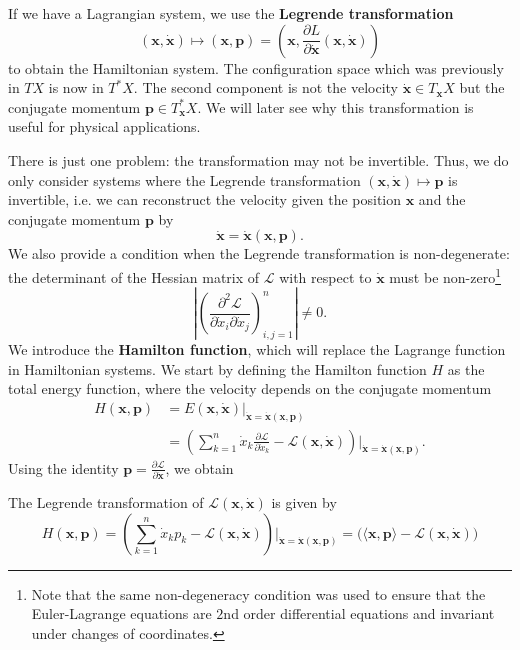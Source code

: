 \documentclass[hidelinks,a4paper, 11pt]{article}
\theoremstyle{plain}
\theoremstyle{break}
\theoremstyle{plain}
\theoremstyle{definition}
\begin{document}
{If we have a Lagrangian system, we use the \textbf{Legrende transformation}
\[
	(\mathbf x, \mathbf{\dot x}) \mapsto (\mathbf x, \mathbf p) = (\mathbf x, \frac{\partial L}{\partial \mathbf{\dot x}}(\mathbf x, \mathbf{\dot x}))
\]
to obtain the Hamiltonian system. The configuration space which was previously in $TX$ is now in $T^*X$. The second component is not the velocity $\mathbf{\dot x} \in T_{\mathbf x}X$ but the conjugate momentum $\mathbf p \in T_{\mathbf x}^*X$. We will later see why this transformation is useful for physical applications.

There is just one problem: the transformation may not be invertible. Thus, we do only consider systems where the Legrende transformation $(\mathbf x, \mathbf{\dot x}) \mapsto \mathbf p$ is invertible, i.e. we can reconstruct the velocity given the position $\mathbf x$ and the conjugate momentum $\mathbf p$ by
\[
	\mathbf{\dot x} = \mathbf{\dot x(\mathbf x, \mathbf p)}.
\]
We also provide a condition when the Legrende transformation is non-degenerate: the determinant of the Hessian matrix of $\mathcal L$ with respect to $\mathbf{\dot x}$ must be non-zero\footnote{Note that the same non-degeneracy condition was used to ensure that the Euler-Lagrange equations are $2$nd order differential equations and invariant under changes of coordinates.}
\[
	\left| \left( \frac{\partial^2 \mathcal L}{\partial \dot x_i \partial \dot x_j}\right)_{i,j=1}^n  \right| \neq 0.
\]
We introduce the \textbf{Hamilton function}, which will replace the Lagrange function in Hamiltonian systems. We start by defining the Hamilton function $H$ as the total energy function, where the velocity depends on the conjugate momentum
\begin{align*}
	H(\mathbf x, \mathbf p) &= E(\mathbf x, \mathbf{\dot x})\Big \vert_{\mathbf{\dot{x}} = \mathbf{\dot x(\mathbf x, \mathbf p)}}\\
	&= \left(\sum^n_{k=1} \dot x_k \frac{\partial \mathcal L}{\partial \dot x_k} - \mathcal L(\mathbf x, \mathbf{\dot x})\right) \Big |_{\mathbf{\dot x} = \mathbf{\dot x}(\mathbf x, \mathbf p)}.
\end{align*}
Using the identity $\mathbf p = \frac{\partial \mathcal L}{\partial\mathbf{\dot x}}$, we obtain
\begin{framed}
	The Legrende transformation of $\mathcal L(\mathbf x, \mathbf{\dot x})$ is given by
	\[
		H(\mathbf x, \mathbf p) = \left(\sum^n_{k=1} \dot x_k p_k - \mathcal L(\mathbf x, \mathbf{\dot x}) \right)
		 \Big |_{\mathbf{\dot x} = \mathbf{\dot x}(\mathbf x, \mathbf p)} = \Big( \langle \mathbf x, \mathbf p \rangle - \mathcal L(\mathbf{ x}, \mathbf{\dot x}) \Big)
\]
\end{framed}}
\end{document}
